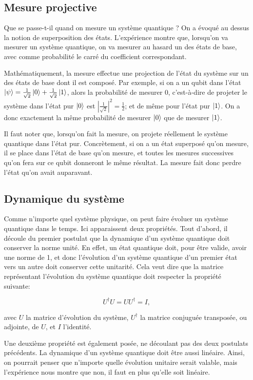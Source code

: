 \subsection{Mesure projective}
Que se passe-t-il quand on mesure un système quantique ? On a évoqué au dessus la notion de superposition des états. L'expérience montre que, lorsqu'on va mesurer un système quantique, on va mesurer au hasard un des états de base, avec comme probabilité le carré du coefficient correspondant.

Mathématiquement, la mesure effectue une projection de l'état du système sur un des états de base dont il est composé. Par exemple, si on a un qubit dans l'état $\ket{\psi} = \frac{1}{\sqrt{2}}\ket{0} + \frac{1}{\sqrt{2}}\ket{1}$, alors la probabilité de mesurer 0, c'est-à-dire de projeter le système dans l'état pur $\ket{0}$ est $|\frac{1}{\sqrt{2}}|^2 = \frac{1}{2}$; et de même pour l'état pur $\ket{1}$. On a donc exactement la même probabilité de mesurer $\ket{0}$ que de mesurer $\ket{1}$.

Il faut noter que, lorsqu'on fait la mesure, on projete réellement le système quantique dans l'état pur. Concrètement, si on a un état superposé qu'on mesure, il se place dans l'état de base qu'on mesure, et toutes les mesures successives qu'on fera sur ce qubit donneront le même résultat. La mesure fait donc perdre l'état qu'on avait auparavant.

\subsection{Dynamique du système}
Comme n'importe quel système physique, on peut faire évoluer un système quantique dans le temps. Ici apparaissent deux propriétés. Tout d'abord, il découle du premier postulat que la dynamique d'un système quantique doit conserver la norme unité. En effet, un état quantique doit, pour être valide, avoir une norme de 1, et donc l'évolution d'un système quantique d'un premier état vers un autre doit conserver cette unitarité. Cela veut dire que la matrice représentant l'évolution du système quantique doit respecter la propriété suivante:

\begin{equation}
    U^{\dagger}U = UU^{\dagger} = I,
\end{equation}

avec $U$ la matrice d'évolution du système, $U^{\dagger}$ la matrice conjuguée transposée, ou adjointe, de $U$, et $I$ l'identité.

Une deuxième propriété est également posée, ne découlant pas des deux postulats précédents. La dynamique d'un système quantique doit être aussi linéaire. Ainsi, on pourrait penser que n'importe quelle évolution unitaire serait valable, mais l'expérience nous montre que non, il faut en plus qu'elle soit linéaire.

